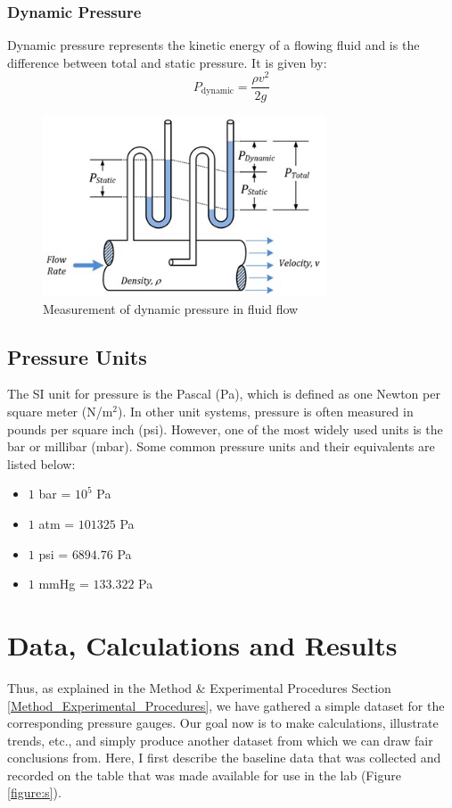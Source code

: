 \documentclass{article}
\begin{document}
	\subsubsection{Dynamic Pressure}
	Dynamic pressure represents the kinetic energy of a flowing fluid and is the difference between total and static pressure. It is given by:
	\begin{equation}
		P_{\text{dynamic}} = \frac{\rho v^2}{2g}
		\label{eq:dynamic}
	\end{equation}	
	\begin{figure}[H]
		\centering
		\includegraphics[width=0.75\textwidth]{images/Flow Rate.jpg}
		\caption{Measurement of dynamic pressure in fluid flow}
		\label{fig:flow_rate}
	\end{figure}
	
	\subsection*{Pressure Units}
	The SI unit for pressure is the Pascal (Pa), which is defined as one Newton per square meter (N/m\(^2\)). In other unit systems, pressure is often measured in pounds per square inch (psi). However, one of the most widely used units is the bar or millibar (mbar). Some common pressure units and their equivalents are listed below:
	
	\begin{itemize}
		\item \(1\) bar = \(10^5\) Pa
		\item \(1\) atm = \(101325\) Pa
		\item \(1\) psi = \(6894.76\) Pa
		\item \(1\) mmHg = \(133.322\) Pa
	\end{itemize}
	
	
	
	
	\newpage	
	\section{Data, Calculations and Results}
	Thus, as explained in the Method \& Experimental Procedures Section \ref{Method_Experimental_Procedures}, we have gathered a simple dataset for the corresponding pressure gauges. Our goal now is to make calculations, illustrate trends, etc., and simply produce another dataset from which we can draw fair conclusions from. Here, I first describe the baseline data that was collected and recorded on the table that was made available for use in the lab (Figure \ref{figure:s}).
\end{document}
